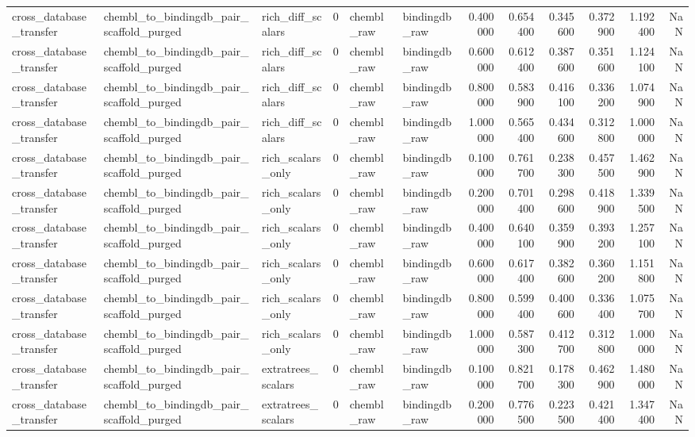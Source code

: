 \begin{longtable}{lllrllrrrrrr}
cross\_database\_transfer & chembl\_to\_bindingdb\_pair\_scaffold\_purged & rich\_diff\_scalars & 0 & chembl\_raw & bindingdb\_raw & 0.400000 & 0.654400 & 0.345600 & 0.372900 & 1.192400 & NaN \\
cross\_database\_transfer & chembl\_to\_bindingdb\_pair\_scaffold\_purged & rich\_diff\_scalars & 0 & chembl\_raw & bindingdb\_raw & 0.600000 & 0.612400 & 0.387600 & 0.351600 & 1.124100 & NaN \\
cross\_database\_transfer & chembl\_to\_bindingdb\_pair\_scaffold\_purged & rich\_diff\_scalars & 0 & chembl\_raw & bindingdb\_raw & 0.800000 & 0.583900 & 0.416100 & 0.336200 & 1.074900 & NaN \\
cross\_database\_transfer & chembl\_to\_bindingdb\_pair\_scaffold\_purged & rich\_diff\_scalars & 0 & chembl\_raw & bindingdb\_raw & 1.000000 & 0.565400 & 0.434600 & 0.312800 & 1.000000 & NaN \\
cross\_database\_transfer & chembl\_to\_bindingdb\_pair\_scaffold\_purged & rich\_scalars\_only & 0 & chembl\_raw & bindingdb\_raw & 0.100000 & 0.761700 & 0.238300 & 0.457500 & 1.462900 & NaN \\
cross\_database\_transfer & chembl\_to\_bindingdb\_pair\_scaffold\_purged & rich\_scalars\_only & 0 & chembl\_raw & bindingdb\_raw & 0.200000 & 0.701400 & 0.298600 & 0.418900 & 1.339500 & NaN \\
cross\_database\_transfer & chembl\_to\_bindingdb\_pair\_scaffold\_purged & rich\_scalars\_only & 0 & chembl\_raw & bindingdb\_raw & 0.400000 & 0.640100 & 0.359900 & 0.393200 & 1.257100 & NaN \\
cross\_database\_transfer & chembl\_to\_bindingdb\_pair\_scaffold\_purged & rich\_scalars\_only & 0 & chembl\_raw & bindingdb\_raw & 0.600000 & 0.617400 & 0.382600 & 0.360200 & 1.151800 & NaN \\
cross\_database\_transfer & chembl\_to\_bindingdb\_pair\_scaffold\_purged & rich\_scalars\_only & 0 & chembl\_raw & bindingdb\_raw & 0.800000 & 0.599400 & 0.400600 & 0.336400 & 1.075700 & NaN \\
cross\_database\_transfer & chembl\_to\_bindingdb\_pair\_scaffold\_purged & rich\_scalars\_only & 0 & chembl\_raw & bindingdb\_raw & 1.000000 & 0.587300 & 0.412700 & 0.312800 & 1.000000 & NaN \\
cross\_database\_transfer & chembl\_to\_bindingdb\_pair\_scaffold\_purged & extratrees\_scalars & 0 & chembl\_raw & bindingdb\_raw & 0.100000 & 0.821700 & 0.178300 & 0.462900 & 1.480000 & NaN \\
cross\_database\_transfer & chembl\_to\_bindingdb\_pair\_scaffold\_purged & extratrees\_scalars & 0 & chembl\_raw & bindingdb\_raw & 0.200000 & 0.776500 & 0.223500 & 0.421400 & 1.347400 & NaN \\

\end{longtable}
